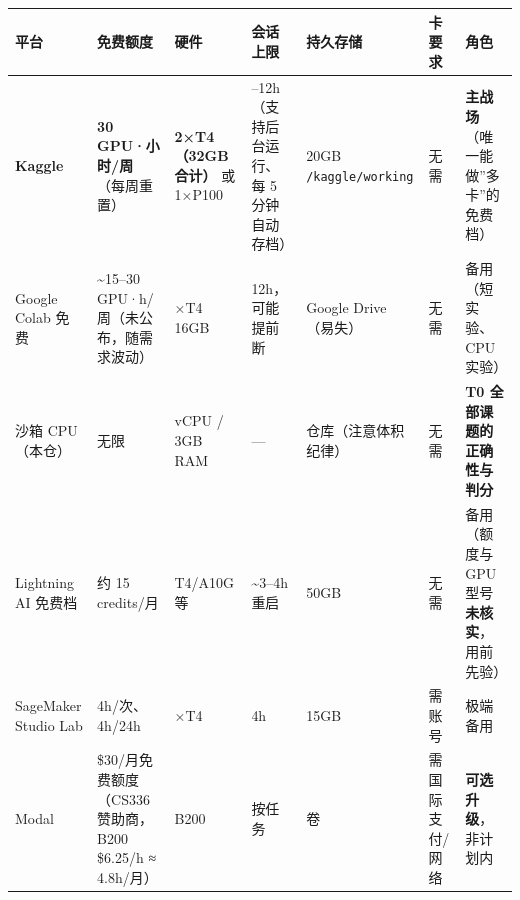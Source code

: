 \documentclass[
  chinese,
  11pt,
]{ctexart}
\newcounter{none} %
\begin{document}
{\def\LTcaptype{none} %
\begin{longtable}[]{@{}
  >{\raggedright\arraybackslash}p{}
  >{\raggedright\arraybackslash}p{}
  >{\raggedright\arraybackslash}p{}
  >{\raggedright\arraybackslash}p{}
  >{\raggedright\arraybackslash}p{}
  >{\raggedright\arraybackslash}p{}
  >{\raggedright\arraybackslash}p{}@{}}
\toprule\noalign{}
\begin{minipage}[b]{\linewidth}\raggedright
平台
\end{minipage} & \begin{minipage}[b]{\linewidth}\raggedright
免费额度
\end{minipage} & \begin{minipage}[b]{\linewidth}\raggedright
硬件
\end{minipage} & \begin{minipage}[b]{\linewidth}\raggedright
会话上限
\end{minipage} & \begin{minipage}[b]{\linewidth}\raggedright
持久存储
\end{minipage} & \begin{minipage}[b]{\linewidth}\raggedright
卡要求
\end{minipage} & \begin{minipage}[b]{\linewidth}\raggedright
角色
\end{minipage} \\
\midrule\noalign{}
\endhead
\bottomrule\noalign{}
\endlastfoot
\textbf{Kaggle} & \textbf{30 GPU·小时/周}（每周重置） & \textbf{2×T4（32GB 合计）} 或 1×P100 & 9--12h（支持后台运行、每 5 分钟自动存档） & 20GB \texttt{/kaggle/working} & 无需 & \textbf{主战场}（唯一能做''多卡''的免费档） \\
Google Colab 免费 & \textasciitilde15--30 GPU·h/周（未公布，随需求波动） & 1×T4 16GB & 12h，可能提前断 & Google Drive（易失） & 无需 & 备用（短实验、CPU 实验） \\
沙箱 CPU（本仓） & 无限 & 2 vCPU / 3GB RAM & --- & 仓库（注意体积纪律） & 无需 & \textbf{T0 全部课题的正确性与判分} \\
Lightning AI 免费档 & 约 15 credits/月 & T4/A10G 等 & \textasciitilde3--4h 重启 & 50GB & 无需 & 备用（额度与 GPU 型号\textbf{未核实}，用前先验） \\
SageMaker Studio Lab & 4h/次、4h/24h & 1×T4 & 4h & 15GB & 需账号 & 极端备用 \\
Modal & \$30/月免费额度（CS336 赞助商，B200 \$6.25/h ≈ 4.8h/月） & B200 & 按任务 & 卷 & 需国际支付/网络 & \textbf{可选升级}，非计划内 \\
\end{longtable}
}
\end{document}
